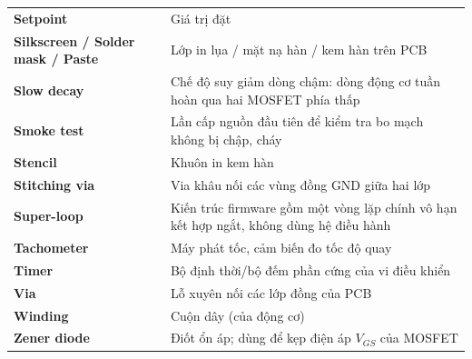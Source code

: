 {\begin{longtable}{@{}>{\raggedright\arraybackslash\bfseries}p{3.6cm}>{\raggedright\arraybackslash}p{11.3cm}@{}}
Setpoint & Giá trị đặt\\
Silkscreen / Solder mask / Paste & Lớp in lụa / mặt nạ hàn / kem hàn trên PCB\\
Slow decay & Chế độ suy giảm dòng chậm: dòng động cơ tuần hoàn qua hai MOSFET phía thấp\\
Smoke test & Lần cấp nguồn đầu tiên để kiểm tra bo mạch không bị chập, cháy\\
Stencil & Khuôn in kem hàn\\
Stitching via & Via khâu nối các vùng đồng GND giữa hai lớp\\
Super-loop & Kiến trúc firmware gồm một vòng lặp chính vô hạn kết hợp ngắt, không dùng hệ điều hành\\
Tachometer & Máy phát tốc, cảm biến đo tốc độ quay\\
Timer & Bộ định thời/bộ đếm phần cứng của vi điều khiển\\
Via & Lỗ xuyên nối các lớp đồng của PCB\\
Winding & Cuộn dây (của động cơ)\\
Zener diode & Điốt ổn áp; dùng để kẹp điện áp $V_{GS}$ của MOSFET\\
\end{longtable}
}
